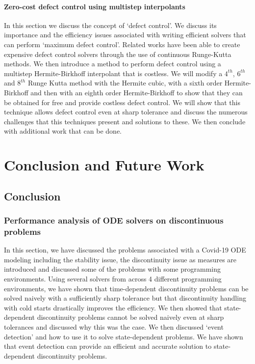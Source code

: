 \documentclass{article}
\begin{document}
\paragraph{Zero-cost defect control using multistep interpolants}
In this section we discuss the concept of `defect control'. We discuss its importance and the efficiency issues associated with writing efficient solvers that can perform `maximum defect control'. Related works have been able to create expensive defect control solvers through the use of continuous Runge-Kutta methods. We then introduce a method to perform defect control using a multistep Hermite-Birkhoff interpolant that is costless. We will modify a $4^{th}$, $6^{th}$ and $8^{th}$ Runge Kutta method with the Hermite cubic, with a sixth order Hermite-Birkhoff and then with an eighth order Hermite-Birkhoff to show that they can be obtained for free and provide costless defect control. We will show that this technique allows defect control even at sharp tolerance and discuss the numerous challenges that this techniques present and solutions to these. We then conclude with additional work that can be done.

\section{Conclusion and Future Work}
\subsection{Conclusion}
\subsubsection{Performance analysis of ODE solvers on discontinuous problems}
In this section, we have discussed the problems associated with a Covid-19 ODE modeling including the stability issue, the discontinuity issue as measures are introduced and discussed some of the problems with some programming environments. Using several solvers from across 4 different programming environments, we have shown that time-dependent discontinuity problems can be solved naively with a sufficiently sharp tolerance but that discontinuity handling with cold starts drastically improves the efficiency. We then showed that state-dependent discontinuity problems cannot be solved naively even at sharp tolerances and discussed why this was the case. We then discussed `event detection' and how to use it to solve state-dependent problems. We have shown that event detection can provide an efficient and accurate solution to state-dependent discontinuity problems.
\end{document}
